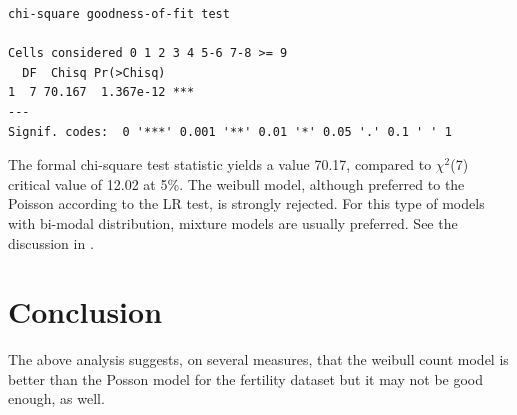 \documentclass[a4paper,twoside,11pt]{article}
\begin{document}
\begin{verbatim}
chi-square goodness-of-fit test

Cells considered 0 1 2 3 4 5-6 7-8 >= 9
  DF  Chisq Pr(>Chisq)    
1  7 70.167  1.367e-12 ***
---
Signif. codes:  0 '***' 0.001 '**' 0.01 '*' 0.05 '.' 0.1 ' ' 1
\end{verbatim}

The formal chi-square test statistic yields a value 
70.17, compared to
\(\chi^{\text{2}}\)(7) critical value of 12.02 at 5\%. The weibull model, although preferred to
the Poisson according to the LR test, is strongly rejected. For this type of
models with bi-modal distribution, mixture models are usually preferred. See the
discussion in \citet[Chapter 6.2]{cameron2013regression}.
\section{Conclusion}
\label{sec:orge56249e}

The above analysis suggests, on several measures, that 
the weibull count model is better than the Posson model for the fertility
dataset but it may not be good enough, as well. 



\label{sec:orgebcc268}


\end{document}
